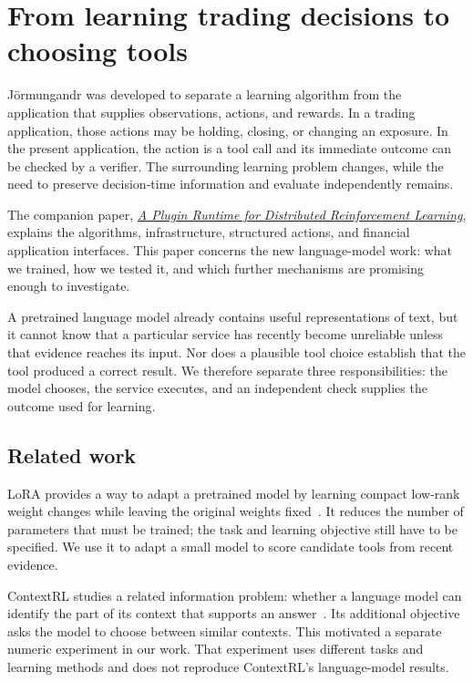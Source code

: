 \documentclass{strategynet-journal}
\begin{document}
\section{From learning trading decisions to choosing tools}
\begin{SNcolumns}

Jörmungandr was developed to separate a learning algorithm from the application
that supplies observations, actions, and rewards. In a trading application,
those actions may be holding, closing, or changing an exposure. In the present
application, the action is a tool call and its immediate outcome can be checked
by a verifier. The surrounding learning problem changes, while the need to
preserve decision-time information and evaluate independently remains.

The companion paper, \href{https://strategynet.ai/white-papers/jormungandr-plugin-runtime.pdf}{\emph{A Plugin Runtime for Distributed Reinforcement Learning}},
explains the algorithms, infrastructure, structured actions, and financial
application interfaces. This paper concerns the new language-model work:
what we trained, how we tested it, and which further mechanisms are promising
enough to investigate.

A pretrained language model already contains useful representations of text,
but it cannot know that a particular service has recently become unreliable
unless that evidence reaches its input. Nor does a plausible tool choice
establish that the tool produced a correct result. We therefore separate
three responsibilities: the model chooses, the service executes, and an
independent check supplies the outcome used for learning.

\subsection{Related work}

LoRA provides a way to adapt a pretrained model by learning compact low-rank
weight changes while leaving the original weights fixed~\cite{lora}. It
reduces the number of parameters that must be trained; the task and learning
objective still have to be specified. We use it to adapt a small model to
score candidate tools from recent evidence.

ContextRL studies a related information problem: whether a language model can
identify the part of its context that supports an answer~\cite{contextrl}.
Its additional objective asks the model to choose between similar contexts.
This motivated a separate numeric experiment in our work. That experiment
uses different tasks and learning methods and does not reproduce ContextRL's
language-model results.


\end{SNcolumns}
\end{document}
